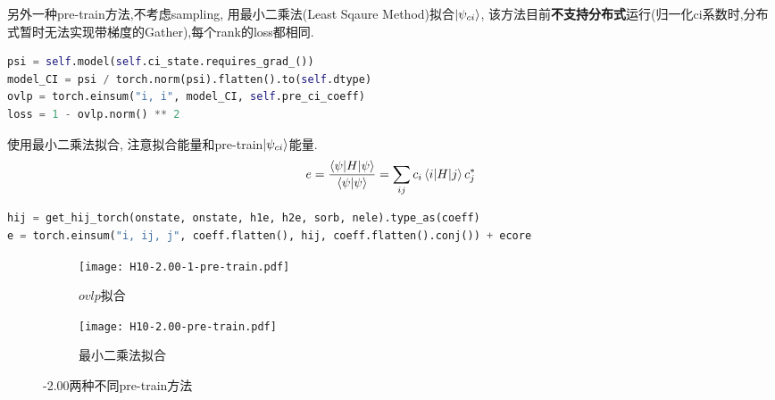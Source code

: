 另外一种pre-train方法,不考虑sampling, 用最小二乘法(Least Sqaure Method)拟合$\ket{\psi_{ci}}$,
该方法目前\textbf{不支持分布式}运行(归一化ci系数时,分布式暂时无法实现带梯度的Gather),每个rank的loss都相同.
\begin{lstlisting}[language=Python]
psi = self.model(self.ci_state.requires_grad_())
model_CI = psi / torch.norm(psi).flatten().to(self.dtype)
ovlp = torch.einsum("i, i", model_CI, self.pre_ci_coeff)
loss = 1 - ovlp.norm() ** 2
\end{lstlisting}
使用最小二乘法拟合,
注意拟合能量和pre-train$\ket{\psi_{ci}}$能量.
\begin{equation}
    e = \frac{\braket{\psi|H|\psi}}{\braket{\psi|\psi}} = \sum_{ij}c_i\braket{i|H|j}c_j^*
\end{equation}

\begin{lstlisting}[language=Python]
hij = get_hij_torch(onstate, onstate, h1e, h2e, sorb, nele).type_as(coeff)
e = torch.einsum("i, ij, j", coeff.flatten(), hij, coeff.flatten().conj()) + ecore
\end{lstlisting}

\begin{figure}[htp]
    \begin{subfigure}[b]{0.48\textwidth}
        \centering
        \texttt{[image: H10-2.00-1-pre-train.pdf]}
        \caption{$ovlp$拟合}
    \end{subfigure}
    \begin{subfigure}[b]{0.48\textwidth}
        \centering
        \texttt{[image: H10-2.00-pre-train.pdf]}
        \caption{最小二乘法拟合}
    \end{subfigure}
    \caption{-2.00两种不同pre-train方法}
\end{figure}